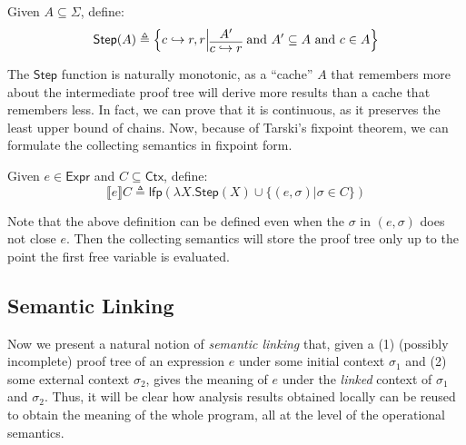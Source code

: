 \documentclass[acmsmall,screen,review]{acmart}\settopmatter{printfolios=true,printccs=false,printacmref=false}
\theoremstyle{acmdefinition}
\newcommand*{\Expr}{\mathsf{Expr}}
\newcommand*{\ctx}{\sigma}
\newcommand*{\Ctx}{\mathsf{Ctx}}
\newcommand*{\config}{c}
\newcommand*{\rightst}{r}
\newcommand*{\lfp}{\mathsf{lfp}}
\newcommand*{\semarrow}{\hookrightarrow}
\newcommand*{\sembracket}[1]{\lBrack{#1}\rBrack}
\begin{document}
\begin{definition}
  Given $A\subseteq\Sigma$, define:
  \[
    \mathsf{Step}(A)\triangleq
    \left\{\config\semarrow\rightst, \rightst\middle|
    \begin{prooftree}[center=true]
      \hypo{A'}\infer1{\config\semarrow\rightst}
    \end{prooftree}\text{ and }
    A'\subseteq A\text{ and }\config\in A
    \right\}
  \]
\end{definition}

The $\mathsf{Step}$ function is naturally monotonic, as a ``cache'' $A$ that remembers more about the intermediate proof tree will derive more results than a cache that remembers less.
In fact, we can prove that it is continuous, as it preserves the least upper bound of chains.
Now, because of Tarski's fixpoint theorem, we can formulate the collecting semantics in fixpoint form.
\begin{definition}
  Given $e\in\Expr$ and $C\subseteq\Ctx$, define:
  \[
    \sembracket{e}C\triangleq\lfp(\lambda X.\mathsf{Step}(X)\cup\{(e,\ctx)|\ctx\in C\})
  \]
\end{definition}
Note that the above definition can be defined even when the $\ctx$ in $(e,\ctx)$ does not close $e$.
Then the collecting semantics will store the proof tree only up to the point the first free variable is evaluated.

\subsection{Semantic Linking}
Now we present a natural notion of \emph{semantic linking} that, given a (1) (possibly incomplete) proof tree of an expression $e$ under some initial context $\ctx_1$ and (2) some external context $\ctx_2$, gives the meaning of $e$ under the \emph{linked} context of $\ctx_1$ and $\ctx_2$.
Thus, it will be clear how analysis results obtained locally can be reused to obtain the meaning of the whole program, all at the level of the operational semantics.
\end{document}
